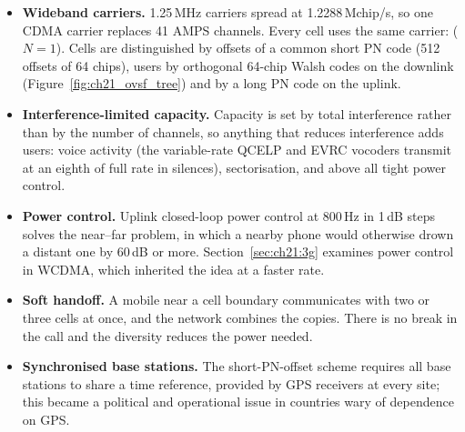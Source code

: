 \begin{itemize}
\item \textbf{Wideband carriers.} 1.25\,MHz carriers spread at 1.2288\,Mchip/s, so one CDMA carrier
replaces 41 AMPS channels. Every cell uses the same carrier: 
($N=1$). Cells are distinguished by offsets of a common short PN code (512 offsets of 64 chips),
users by orthogonal 64-chip Walsh codes on the downlink (Figure~\ref{fig:ch21_ovsf_tree}) and by a
long PN code on the uplink.
\item \textbf{Interference-limited capacity.} Capacity is set by total interference rather than by
the number of channels, so anything that reduces interference adds users: voice activity (the
variable-rate QCELP and EVRC vocoders transmit at an eighth of full rate in silences),
sectorisation, and above all tight power control.
\item \textbf{Power control.} Uplink closed-loop power control at 800\,Hz in 1\,dB steps solves the
near--far problem, in which a nearby phone would otherwise drown a distant one by 60\,dB or more.
Section~\ref{sec:ch21:3g} examines power control in WCDMA, which inherited the idea at a faster
rate.
\item \textbf{Soft handoff.} A mobile near a cell boundary communicates with two or three cells at
once, and the network combines the copies. There is no break in the call and the diversity reduces
the power needed.
\item \textbf{Synchronised base stations.} The short-PN-offset scheme requires all base stations to
share a time reference, provided by GPS receivers at every site; this became a political and
operational issue in countries wary of dependence on GPS.
\end{itemize}


